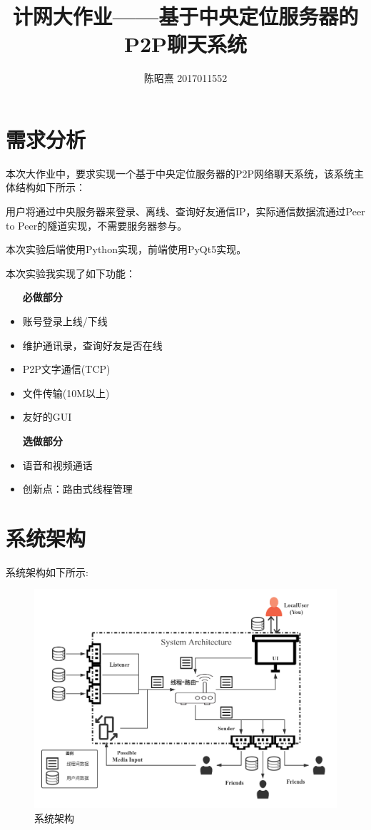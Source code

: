 \documentclass[UTF8]{ctexart}
\begin{document}
\title{计网大作业——基于中央定位服务器的P2P聊天系统}
\author{陈昭熹 2017011552}
\maketitle
\tableofcontents
\newpage

\section{需求分析}
本次大作业中，要求实现一个基于中央定位服务器的P2P网络聊天系统，该系统主体结构如下所示：

用户将通过中央服务器来登录、离线、查询好友通信IP，实际通信数据流通过Peer to Peer的隧道实现，不需要服务器参与。

本次实验后端使用Python实现，前端使用PyQt5实现。

本次实验我实现了如下功能：
\begin{itemize}
    \item[\textbf{必做部分}] 
    \item 账号登录上线/下线
    \item 维护通讯录，查询好友是否在线
    \item P2P文字通信(TCP)
    \item 文件传输(10M以上)
    \item 友好的GUI
    \item[\textbf{选做部分}]
    \item 语音和视频通话
    \item 创新点：路由式线程管理 
\end{itemize}

\section{系统架构}\label{arch}
系统架构如下所示:
\begin{figure}[H]
    \centering
    \includegraphics[scale=0.33]{myqq.png}
    \caption{系统架构}
\end{figure}
\end{document}
